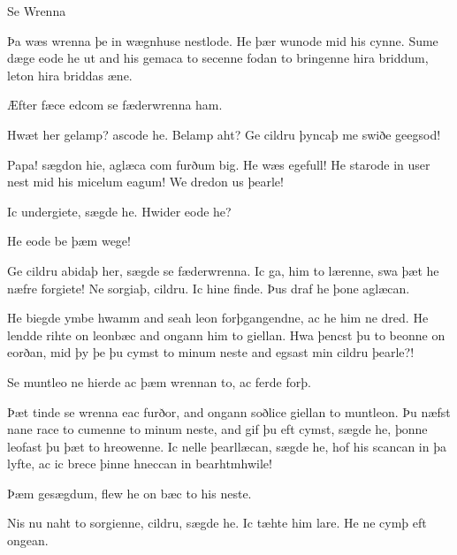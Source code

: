 \documentclass[a4paper,12pt,british]{article}
\begin{document}
\oescript\Large

{\huge Se Wrenna}
\vspace*{.7cm}

Þa wæs wrenna þe in wægnhuse nestlode. He þær wunode mid his
cynne. Sume dæge eode he ut and his gemaca to secenne fodan to
bringenne hira briddum, leton hira briddas æne.

Æfter fæce edcom se fæderwrenna ham.

Hwæt her gelamp? ascode he. Belamp aht? Ge cildru þyncaþ me swiðe
geegsod!

Papa! sægdon hie, aglæca com furðum big. He wæs egefull! He starode
in user nest mid his micelum eagum! We dredon us þearle!

Ic undergiete, sægde he. Hwider eode he?

He eode be þæm wege!

Ge cildru abidaþ her, sægde se fæderwrenna. Ic ga, him to lærenne,
swa þæt he næfre forgiete! Ne sorgiaþ, cildru. Ic hine finde. Þus
draf he þone aglæcan.

He biegde ymbe hwamm and seah leon forþgangendne, ac he him ne
dred. He lendde rihte on leonbæc and ongann him to giellan. Hwa
þencst þu to beonne on eorðan, mid þy þe þu cymst to minum neste and
egsast min cildru þearle?!

Se muntleo ne hierde ac þæm wrennan to, ac ferde forþ.

Þæt tinde se wrenna eac furðor, and ongann soðlice giellan to
muntleon. Þu næfst nane race to cumenne to minum neste, and gif þu
eft cymst, sægde he, þonne leofast þu þæt to hreowenne. Ic nelle
þearllæcan, sægde he, hof his scancan in þa lyfte, ac ic brece þinne
hneccan in bearhtmhwile!

Þæm gesægdum, flew he on bæc to his neste.

Nis nu naht to sorgienne, cildru, sægde he. Ic tæhte him lare. He
ne cymþ eft ongean.
\end{document}
